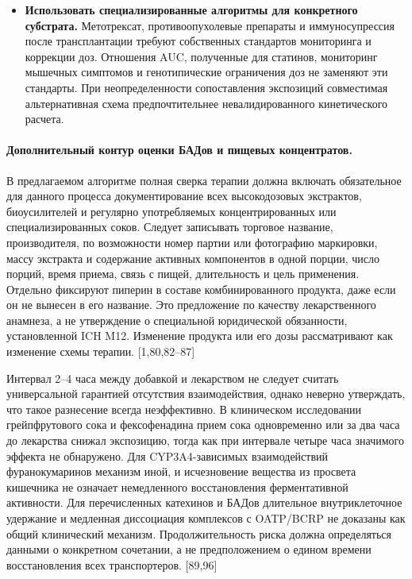 \documentclass[11pt]{article}
\begin{document}
\begin{itemize}
\item \textbf{Использовать специализированные алгоритмы для конкретного субстрата.} Метотрексат, противоопухолевые препараты и иммуносупрессия после трансплантации требуют собственных стандартов мониторинга и коррекции доз. Отношения AUC, полученные для статинов, мониторинг мышечных симптомов и генотипические ограничения доз не заменяют эти стандарты. При неопределенности сопоставления экспозиций совместимая альтернативная схема предпочтительнее невалидированного кинетического расчета.
\end{itemize}

\paragraph{Дополнительный контур оценки БАДов и пищевых концентратов.}
В предлагаемом алгоритме полная сверка терапии должна включать обязательное для данного процесса документирование всех высокодозовых экстрактов, биоусилителей и регулярно употребляемых концентрированных или специализированных соков. Следует записывать торговое название, производителя, по возможности номер партии или фотографию маркировки, массу экстракта и содержание активных компонентов в одной порции, число порций, время приема, связь с пищей, длительность и цель применения. Отдельно фиксируют пиперин в составе комбинированного продукта, даже если он не вынесен в его название. Это предложение по качеству лекарственного анамнеза, а не утверждение о специальной юридической обязанности, установленной ICH M12. Изменение продукта или его дозы рассматривают как изменение схемы терапии. [1,80,82--87]

Интервал 2--4 часа между добавкой и лекарством не следует считать универсальной гарантией отсутствия взаимодействия, однако неверно утверждать, что такое разнесение всегда неэффективно. В клиническом исследовании грейпфрутового сока и фексофенадина прием сока одновременно или за два часа до лекарства снижал экспозицию, тогда как при интервале четыре часа значимого эффекта не обнаружено. Для CYP3A4-зависимых взаимодействий фуранокумаринов механизм иной, и исчезновение вещества из просвета кишечника не означает немедленного восстановления ферментативной активности. Для перечисленных катехинов и БАДов длительное внутриклеточное удержание и медленная диссоциация комплексов с OATP/BCRP не доказаны как общий клинический механизм. Продолжительность риска должна определяться данными о конкретном сочетании, а не предположением о едином времени восстановления всех транспортеров. [89,96]
\end{document}
